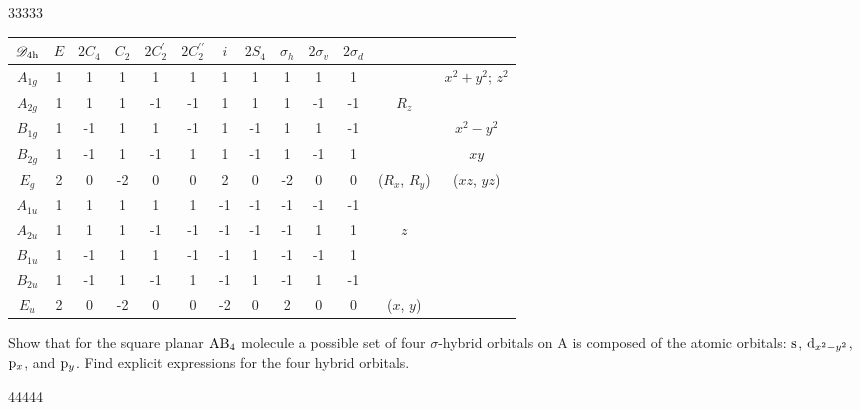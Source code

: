 \documentclass[a4paper]{book}
\newcommand{\orb}[1]{{\rm #1}}
\newcommand{\orbs}{\orb{s}}
\newcommand{\orbp}{\orb{p}}
\newcommand{\orbd}{\orb{d}}
\begin{document}
	\begin{solution}
		33333
		\begin{center}
		\begin{tabular}{ccccccccccccc}\hline
	$\mathscr{D}_{\rm 4h}$ & $E$ & $2C_4$ &	$C_2$	& $2C^\prime_2$	&	$2C^{\prime\prime}_2$	&	$i$	&	$2S_4$	&	$\sigma_{h}$	&	$2\sigma_{v}$ &	$2\sigma_{d}$	&		&\\ \hline
			$A_{1g}$	&	1	&	1	&	1	&	1	&	1	&	1	&	1	&	1	&	1	&	1	&		&	$x^2+y^2$; $z^2$\\
			$A_{2g}$	&	1	&	1	&	1	&	-1	&	-1	&	1	&	1	&	1	&	-1	&	-1	& $R_z$	&	\\
			$B_{1g}$	&	1	&	-1	&	1	&	1	&	-1	&	1	&	-1	&	1	&	1	&	-1	&		&	$x^2-y^2$\\
			$B_{2g}$ 	&	1	&	-1	&	1	&	-1	&	1	&	1	&	-1	&	1	&	-1	&	1	&		&	$xy$	\\
			$E_g$ 		&	2	&	0	&	-2	&	0	&	0	&	2	&	0	&	-2	&	0	&	0	& ($R_x$, $R_y$) & ($xz$, $yz$)\\ 
			$A_{1u}$	&	1	&	1	&	1	&	1	&	1	&	-1	&	-1	&	-1	&	-1	&	-1	&		&	\\
			$A_{2u}$	&	1	&	1	&	1	&	-1	&	-1	&	-1	&	-1	&	-1	&	1	&	1	&	$z$	&	\\
			$B_{1u}$	&	1	&	-1	&	1	&	1	&	-1	&	-1	&	1	&	-1	&	-1	&	1	&		&	\\
			$B_{2u}$ 	&	1	&	-1	&	1	&	-1	&	1	&	-1	&	1	&	-1	&	1	&	-1	&		&	\\
			$E_u$ 		&	2	&	0	&	-2	&	0	&	0	&	-2	&	0	&	2	&	0	&	0	& ($x$, $y$)	&\\ \hline
		\end{tabular}
		\end{center}
	\end{solution}
	
	\begin{exercise}
		Show that for the square planar $\ce{AB4}$ molecule a possible set of four $\sigma$-hybrid orbitals on A is composed of the atomic orbitals: $\orbs$, $\orbd_{x^2-y^2}$, $\orbp_x$, and $\orbp_y$. Find explicit expressions for the four hybrid orbitals.
	\end{exercise}
	
	\begin{solution}
		44444
	\end{solution}
\end{document}
